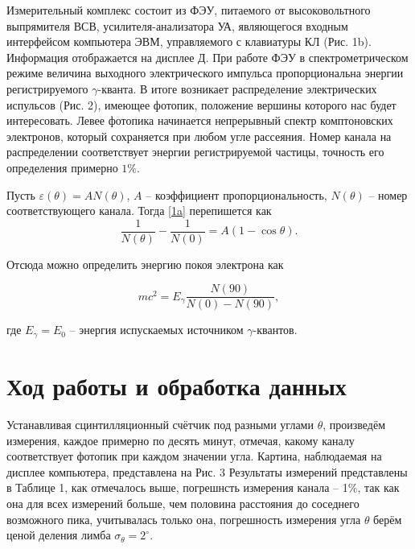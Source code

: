 \documentclass[15pt,a5paper,reqno]{article}
\begin{document}
Измерительный комплекс состоит из ФЭУ, питаемого от высоковольтного выпрямителя ВСВ, усилителя-анализатора УА, являющегося входным интерфейсом компьютера ЭВМ, управляемого с клавиатуры КЛ (Рис. 1b). Информация отображается на дисплее Д. При работе ФЭУ в спектрометрическом режиме величина выходного электрического импульса пропорциональна энергии регистрируемого $\gamma$-кванта. В итоге возникает распределение электрических испульсов (Рис. 2), имеющее фотопик, положение вершины которого нас будет интересовать. Левее фотопика начинается непрерывный спектр комптоновских электронов, который сохраняется при любом угле рассеяния. Номер канала на распределении соответствует энергии регистрируемой частицы, точность его определения примерно $1\%$.


Пусть $\varepsilon(\theta) = AN(\theta)$, $A$ -- коэффициент пропорциональность, $N(\theta)$ -- номер соответствующего канала. Тогда \eqref{1a} перепишется как
\[\tag{1b}\label{1b}
\dfrac{1}{N(\theta)} - \dfrac{1}{N(0)} = A(1-\cos \theta).\]

Отсюда можно определить энергию покоя электрона как 

\begin{equation}
    mc^2 = E_\gamma \dfrac{N(90)}{N(0) - N(90)},
\end{equation}

где $E_\gamma = E_0$ -- энергия испускаемых источником $\gamma$-квантов.

\section{Ход работы и обработка данных}

Устанавливая сцинтилляционный счётчик под разными углами $\theta$, произведём измерения, каждое примерно по десять минут, отмечая, какому каналу соответствует фотопик при каждом значении угла. Картина, наблюдаемая на дисплее компьютера, представлена на Рис. 3
Результаты измерений представлены в Таблице 1, как отмечалось выше, погрешнсть измерения канала -- 1\%, так как она для всех измерений больше, чем половина расстояния до соседнего возможного пика, учитывалась только она, погрешность измерения угла $\theta$ берём ценой деления лимба $\sigma_\theta = 2^\circ$.

\begin{table}[h!]
	\centering
	
	\caption{}
	\label{tb1}
\end{table}  

\begin{table}[h!]
	\centering
	
	\caption{}
	\label{tb1}
\end{table}
\end{document}
